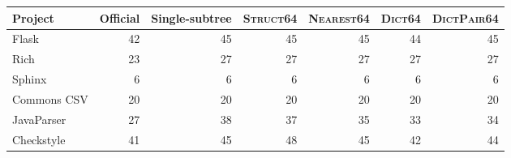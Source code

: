 \begin{tabular}{lrrrrrr}
\toprule
Project & Official & Single-subtree & \textsc{Struct64} & \textsc{Nearest64} & \textsc{Dict64} & \textsc{DictPair64} \\
\midrule
Flask & 42 & 45 & 45 & 45 & 44 & 45 \\
Rich & 23 & 27 & 27 & 27 & 27 & 27 \\
Sphinx & 6 & 6 & 6 & 6 & 6 & 6 \\
Commons CSV & 20 & 20 & 20 & 20 & 20 & 20 \\
JavaParser & 27 & 38 & 37 & 35 & 33 & 34 \\
Checkstyle & 41 & 45 & 48 & 45 & 42 & 44 \\
\bottomrule
\end{tabular}
